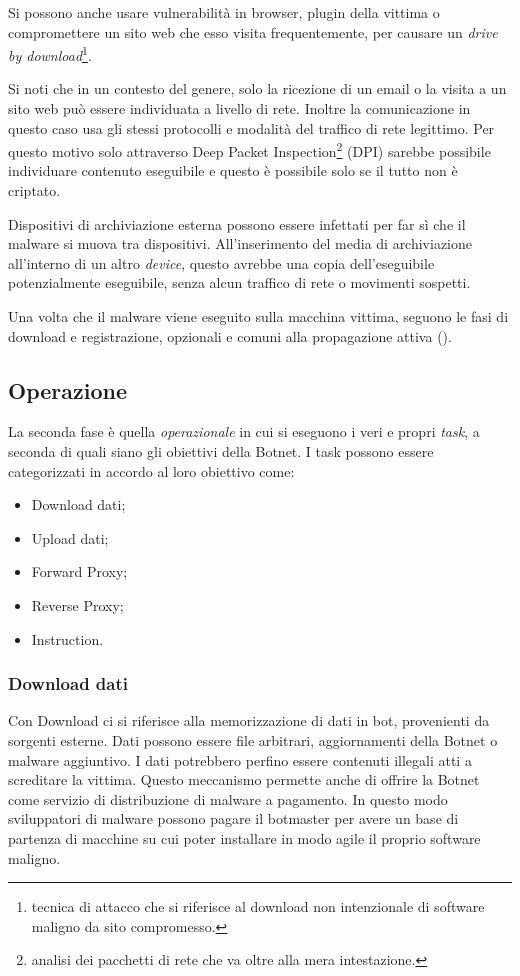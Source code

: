 Si possono anche usare vulnerabilità in browser, plugin della vittima o compromettere un sito web che esso visita frequentemente, per causare un \textit{drive by download}\footnote{tecnica di attacco che si riferisce al download non intenzionale di software maligno da sito compromesso.}.

Si noti che in un contesto del genere, solo la ricezione di un email o la visita a un sito web può essere individuata a livello di rete. Inoltre la comunicazione in questo caso usa gli stessi protocolli e modalità del traffico di rete legittimo. Per questo motivo solo attraverso Deep Packet Inspection\footnote{analisi dei pacchetti di rete che va oltre alla mera intestazione.} (DPI) sarebbe possibile individuare contenuto eseguibile e questo è possibile solo se il tutto non è criptato.

Dispositivi di archiviazione esterna possono essere infettati per far sì che il malware si muova tra dispositivi. All'inserimento del media di archiviazione all'interno di un altro \textit{device}, questo avrebbe una copia dell'eseguibile potenzialmente eseguibile, senza alcun traffico di rete o movimenti sospetti.

Una volta che il malware viene eseguito sulla macchina vittima, seguono le fasi di download e registrazione, opzionali e comuni alla propagazione attiva ().


\subsection{Operazione}
 La seconda fase è quella \textit{operazionale} in cui si eseguono i veri e propri \textit{task}, a seconda di quali siano gli obiettivi della Botnet. I task possono essere categorizzati in accordo al loro obiettivo come: 
\begin{itemize}
    \centering
    \item Download  dati;
    \item Upload  dati;
    \item Forward Proxy;
    \item Reverse Proxy;
    \item Instruction.
\end{itemize}

\subsubsection{Download dati}
Con Download ci si riferisce alla memorizzazione di dati in bot, provenienti da sorgenti esterne. Dati possono essere file arbitrari, aggiornamenti della Botnet o malware aggiuntivo. I dati potrebbero perfino essere contenuti illegali atti a screditare la vittima. Questo meccanismo permette anche di offrire la Botnet come servizio di distribuzione di malware a pagamento. In questo modo sviluppatori di malware possono pagare il botmaster per avere un base di partenza di macchine su cui poter installare in modo agile il proprio software maligno.

